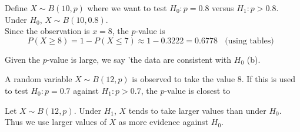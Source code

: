 \documentclass[bigtut]{tutorial}
\begin{document}
\begin{tutorial}
\begin{questions}

\begin{solution}
 Define $X \sim B(10,p)$ where we want to test $H_0: p=0.8$ versus $H_1: p>0.8$. \\
 Under $H_0$, $X \sim B(10,0.8)$. \\
 Since the observation is $x=8$, the $p$-value is
\[ P(X \geq 8)=1-P(X\leq 7) \approx  1-0.3222 = 0.6778 \;\; \text{ (using tables)} \;\; \]

Given the $p$-value is large, we say 'the data are consistent with $H_0$ (b).
\end{solution}


\question 
A random variable $X\sim B(12,p)$ is observed to take the value 8. If this is used to test
$H_0\colon p=0.7$ against $H_1\colon p>0.7$, the $p$-value is closest
to


\begin{solution}
 Let $X \sim B(12,p)$. Under $H_1$, $X$ tends to take larger values than under $H_0$. Thus we use larger values of $X$ as more evidence against $H_0$.  


\end{solution}
\end{questions}
\end{tutorial}
\end{document}

